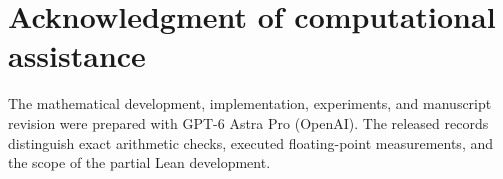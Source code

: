 \documentclass[10pt]{article}
\theoremstyle{definition}\newtheorem{definition}[theorem]{Definition}
\begin{document}
\section*{Acknowledgment of computational assistance}
The mathematical development, implementation, experiments, and manuscript revision were prepared with GPT-6 Astra Pro (OpenAI). The released records distinguish exact arithmetic checks, executed floating-point measurements, and the scope of the partial Lean development.



\end{document}
